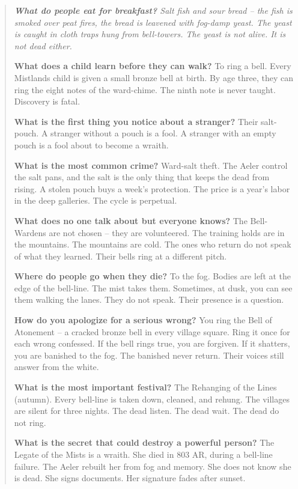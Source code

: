\documentclass[12pt,oneside]{book}
\newenvironment{almanac}
  {\begin{quote}\small\itshape}
  {\end{quote}}
\begin{document}
\vspace{1em}
\begin{almanac}
\textbf{What do people eat for breakfast?} Salt fish and sour bread -- the fish is smoked over peat fires, the bread is leavened with fog-damp yeast. The yeast is caught in cloth traps hung from bell-towers. The yeast is not alive. It is not dead either.

\textbf{What does a child learn before they can walk?} To ring a bell. Every Mistlands child is given a small bronze bell at birth. By age three, they can ring the eight notes of the ward-chime. The ninth note is never taught. Discovery is fatal.

\textbf{What is the first thing you notice about a stranger?} Their salt-pouch. A stranger without a pouch is a fool. A stranger with an empty pouch is a fool about to become a wraith.

\textbf{What is the most common crime?} Ward-salt theft. The Aeler control the salt pans, and the salt is the only thing that keeps the dead from rising. A stolen pouch buys a week's protection. The price is a year's labor in the deep galleries. The cycle is perpetual.

\textbf{What does no one talk about but everyone knows?} The Bell-Wardens are not chosen -- they are volunteered. The training holds are in the mountains. The mountains are cold. The ones who return do not speak of what they learned. Their bells ring at a different pitch.

\textbf{Where do people go when they die?} To the fog. Bodies are left at the edge of the bell-line. The mist takes them. Sometimes, at dusk, you can see them walking the lanes. They do not speak. Their presence is a question.

\textbf{How do you apologize for a serious wrong?} You ring the Bell of Atonement -- a cracked bronze bell in every village square. Ring it once for each wrong confessed. If the bell rings true, you are forgiven. If it shatters, you are banished to the fog. The banished never return. Their voices still answer from the white.

\textbf{What is the most important festival?} The Rehanging of the Lines (autumn). Every bell-line is taken down, cleaned, and rehung. The villages are silent for three nights. The dead listen. The dead wait. The dead do not ring.

\textbf{What is the secret that could destroy a powerful person?} The Legate of the Mists is a wraith. She died in 803 AR, during a bell-line failure. The Aeler rebuilt her from fog and memory. She does not know she is dead. She signs documents. Her signature fades after sunset.
\end{almanac}
\end{document}
